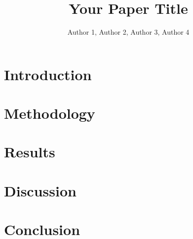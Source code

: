 \documentclass{article}
\title{Your Paper Title}
\author{Author 1, Author 2, Author 3, Author 4}
\begin{document}
\maketitle

\begin{abstract}

\end{abstract}

\section{Introduction}


\section{Methodology}


\section{Results}


\section{Discussion}


\section{Conclusion}




\end{document}
